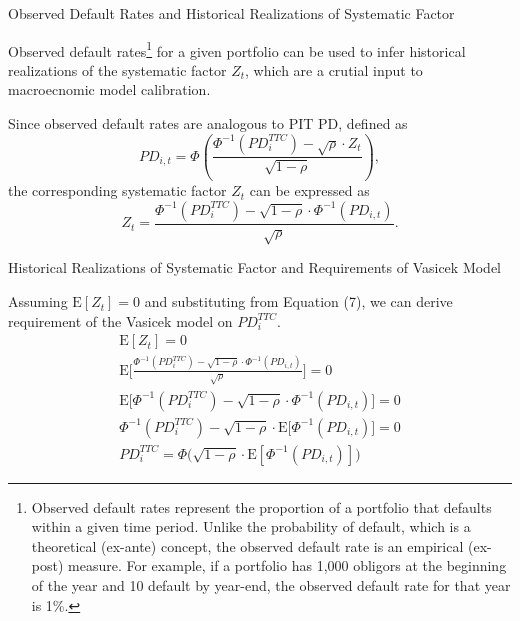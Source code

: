 \documentclass{beamer}
\begin{document}
\begin{frame}{Observed Default Rates and Historical Realizations of Systematic Factor}
\justifying
\small

Observed default rates\footnote{\tiny{Observed default rates represent the proportion of a portfolio that defaults within a given time period. Unlike the probability of default, which is a theoretical (ex-ante) concept, the observed default rate is an empirical (ex-post) measure. For example, if a portfolio has 1,000 obligors at the beginning of the year and 10 default by year-end, the observed default rate for that year is 1\%.}} for a given portfolio can be used to infer historical realizations of the systematic factor $Z_t$, which are a crutial input to macroecnomic model calibration.

\medskip

Since observed default rates are analogous to PIT PD, defined as
\begin{equation*}
PD_{i,t} = \Phi \left( \frac{\Phi^{-1}(PD_i^{TTC}) - \sqrt{\rho} \cdot Z_t}{\sqrt{1 - \rho}} \right),
\end{equation*}
the corresponding systematic factor $Z_t$ can be expressed as
\begin{equation}
Z_t = \frac{\Phi^{-1}(PD_i^{TTC}) - \sqrt{1 - \rho} \cdot \Phi^{-1}(PD_{i,t})}{\sqrt{\rho}}.
\end{equation}

\end{frame}


\begin{frame}{Historical Realizations of Systematic Factor and Requirements of Vasicek Model}
\justifying
\small

Assuming $\mathrm{E}[Z_t] = 0$ and substituting from Equation (7), we can derive requirement of the Vasicek model on $PD_i^{TTC}$.
{\tiny
\begin{equation*}
\begin{aligned}
\mathrm{E}[Z_t] = 0 \\
\mathrm{E} \Bigg[\frac{\Phi^{-1}(PD_i^{TTC}) - \sqrt{1 - \rho} \cdot \Phi^{-1}(PD_{i, t})}{\sqrt{\rho}} \Bigg] = 0 \\
\mathrm{E} \Big[\Phi^{-1}(PD_i^{TTC}) - \sqrt{1 - \rho} \cdot \Phi^{-1}(PD_{i, t}) \Big] = 0 \\
\Phi^{-1}(PD_i^{TTC}) - \sqrt{1 - \rho} \cdot \mathrm{E} \Big[\Phi^{-1}(PD_{i, t}) \Big] = 0 \\
PD_i^{TTC} = \Phi \Big( \sqrt{1 - \rho} \cdot \mathrm{E} [\Phi^{-1}(PD_{i, t})] \Big)
\end{aligned}
\end{equation*}
}

\end{frame}
\end{document}
